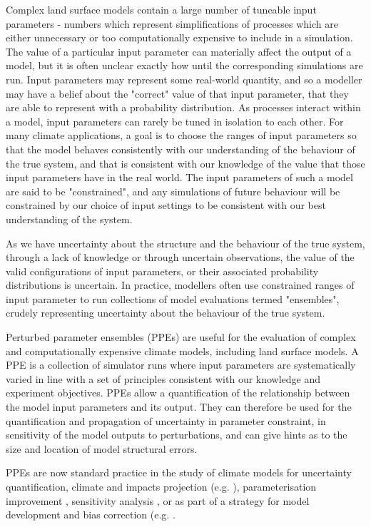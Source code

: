 \documentclass[gmd, manuscript]{copernicus}
\begin{document}
Complex land surface models contain a large number of tuneable input parameters - numbers which represent simplifications of processes which are either unnecessary or too computationally expensive to include in a simulation. The value of a particular input parameter can materially affect the output of a model, but it is often unclear exactly how until the corresponding simulations are run. Input parameters may represent some real-world quantity, and so a modeller may have a belief about the "correct" value of that input parameter, that they are able to represent with a probability distribution. As processes interact within a model, input parameters can rarely be tuned in isolation to each other. For many climate applications, a goal is to choose the ranges of input parameters so that the model behaves consistently with our understanding of the behaviour of the true system, and that is consistent with our knowledge of the value that those input parameters have in the real world. The input parameters of such a model are said to be "constrained", and any simulations of future behaviour will be constrained by our choice of input settings to be consistent with our best understanding of the system.

As we have uncertainty about the structure and the behaviour of the true system, through a lack of knowledge or through uncertain observations, the value of the valid configurations of input parameters, or their associated probability distributions is uncertain. In practice, modellers often use constrained ranges of input parameter to run collections of model evaluations termed "ensembles", crudely representing uncertainty about the behaviour of the true system.

Perturbed parameter ensembles (PPEs) are useful for the evaluation of complex and computationally expensive climate models, including land surface models. A PPE is a collection of simulator runs where input parameters are systematically varied in line with a set of principles consistent with our knowledge and experiment objectives. PPEs allow a quantification of the relationship between the model input parameters and its output. They can therefore be used for the quantification and propagation of uncertainty in parameter constraint, in sensitivity of the model outputs to perturbations, and can give hints as to the size and location of model structural errors.

PPEs are now standard practice in the study of climate models for uncertainty quantification, climate and impacts projection (e.g. \cite{sexton2021perturbed, edwards2019revisiting}), parameterisation improvement \citep{couvreux2021process}, sensitivity analysis \citep{carslaw2013large}, or as part of a strategy for model development and bias correction (e.g. \cite{williamson2015identifying,mcneall2016impact, mcneall2020correcting, hourdin2017art}.
\end{document}
